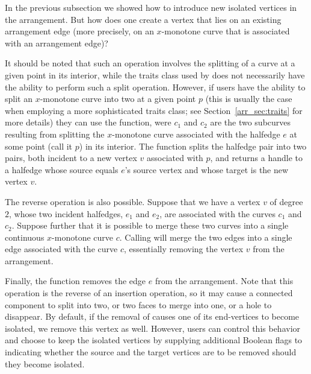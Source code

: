 In the previous subsection we showed how to introduce new isolated
vertices in the arrangement. But how does one create a vertex that
lies on an existing arrangement edge (more precisely, on an
$x$-monotone curve that is associated with an arrangement edge)?

It should be noted that such an operation involves the splitting
of a curve at a given point in its interior, while the traits
class used by  does not necessarily have the
ability to perform such a split operation. However, if users have
the ability to split an $x$-monotone curve into two at a given point
$p$ (this is usually the case when employing a more sophisticated
traits class; see Section~\ref{arr_sec:traits} for more details)
they can use the  function, were
$c_1$ and $c_2$ are the two subcurves resulting from splitting the
$x$-monotone curve associated with the halfedge $e$ at some point
(call it $p$) in its interior. The function splits the halfedge pair into two
pairs, both incident to a new vertex $v$ associated with $p$, and
returns a handle to a halfedge whose source equals $e$'s source
vertex and whose target is the new vertex $v$.

The reverse operation is also possible. Suppose that we have a
vertex $v$ of degree $2$, whose two incident halfedges, $e_1$ and
$e_2$, are associated with the curves $c_1$ and $c_2$. Suppose
further that it is possible to merge these two curves into a single
continuous $x$-monotone curve $c$. Calling 
will merge the two edges into a single edge associated with the curve
$c$, essentially removing the vertex $v$ from the arrangement.

Finally, the function  removes the edge $e$
from the arrangement. Note that this operation is the reverse of
an insertion operation, so it may cause a connected
component to split into two, or two faces to merge into one, or a
hole to disappear. By default, if the removal of  causes one
of its end-vertices to become isolated, we remove this vertex as well.
However, users can control this behavior and choose to keep the
isolated vertices by supplying additional Boolean flags to
 indicating whether the source and the target vertices
are to be removed should they become isolated.


